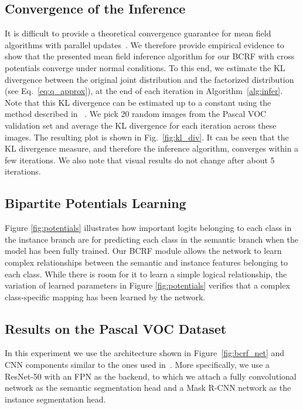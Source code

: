 \subsection{Convergence of the Inference}

It is difficult to provide a theoretical convergence guarantee for mean field algorithms with parallel updates~\cite{Higherorder_mf, Koller_book}. We therefore provide empirical evidence to show that the presented mean field inference algorithm for our BCRF with cross potentials converge under normal conditions. To this end, we estimate the KL divergence between the original joint distribution and the factorized distribution (see Eq.~\eqref{eq:q_approx}), at the end of each iteration in Algorithm~\ref{alg:infer}. Note that this KL divergence can be estimated up to a constant using the method described in ~\cite{densecrf_suppl}. We pick 20 random images from the Pascal VOC validation set and average the KL divergence for each iteration across these images. The resulting plot is shown in Fig.~\ref{fig:kl_div}. It can be seen that the KL divergence measure, and therefore the inference algorithm, converges within a few iterations. We also note that visual results do not change after about 5 iterations.

\subsection{Bipartite Potentials Learning}
Figure \ref{fig:potentials} illustrates how important logits belonging to each class in the instance branch are for predicting each class in the semantic branch when the model has been fully trained. Our BCRF module allows the network to learn complex relationships between the semantic and instance features belonging to each class. While there is room for it to learn a simple logical relationship, the variation of learned parameters in Figure \ref{fig:potentials} verifies that a complex class-specific mapping has been learned by the network. 

\subsection{Results on the Pascal VOC Dataset}

In this experiment we use the architecture shown in Figure~\ref{fig:bcrf_net} and CNN components similar to the ones used in~\cite{Upsnet_paper}. More specifically, we use a ResNet-50 with an FPN as the backend, to which we attach a fully convolutional network as the semantic segmentation head and a Mask R-CNN network as the instance segmentation head. 

